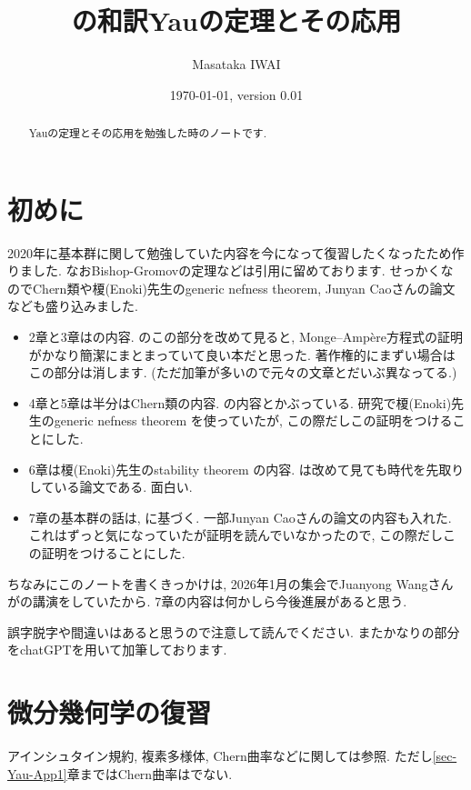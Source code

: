 \documentclass[dvipdfmx,a4paper,11pt]{article} %
\title{の和訳}
\date{\today, version 0.01}
\theoremstyle{definition}
\theoremstyle{remark}
\numberwithin{equation}{section}
\begin{document}
\title{Yauの定理とその応用}
\author{Masataka IWAI}

\maketitle
%
\begin{abstract}
Yauの定理とその応用を勉強した時のノートです. 
\end{abstract}
%
\setcounter{tocdepth}{3}
\tableofcontents

\section*{初めに}

2020年に基本群に関して勉強していた内容を今になって復習したくなったため作りました. 
なおBishop-Gromovの定理などは引用に留めております. 
せっかくなのでChern類や榎(Enoki)先生のgeneric nefness theorem\cite{Eno88}, Junyan Caoさんの論文\cite{Cao13}なども盛り込みました. 

\begin{itemize}
\item 2章と3章は\cite[Section 2, 3]{Sze14}の内容. \cite{Sze14}のこの部分を改めて見ると, Monge--Amp\`ere方程式の証明がかなり簡潔にまとまっていて良い本だと思った. 著作権的にまずい場合はこの部分は消します. (ただ加筆が多いので元々の文章とだいぶ異なってる.)
\item 4章と5章は半分はChern類の内容. \cite[Section 4--6]{Iwa-Chern}の内容とかぶっている. 研究で榎(Enoki)先生のgeneric nefness theorem \cite{Eno88}を使っていたが, この際だしこの証明をつけることにした. 
\item 6章は榎(Enoki)先生のstability theorem \cite{Eno88}の内容. \cite{Eno88}は改めて見ても時代を先取りしている論文である. 面白い. 
\item 7章の基本群の話は, \cite{DPS96, Paun98}に基づく. 一部Junyan Caoさんの論文\cite{Cao13}の内容も入れた. これはずっと気になっていたが証明を読んでいなかったので, この際だしこの証明をつけることにした.
\end{itemize}

ちなみにこのノートを書くきっかけは, 2026年1月の集会でJuanyong Wangさんが\cite{FGSW26}の講演をしていたから. 7章の内容は何かしら今後進展があると思う. 

誤字脱字や間違いはあると思うので注意して読んでください. またかなりの部分をchatGPTを用いて加筆しております. 

\newpage

\section{微分幾何学の復習}
アインシュタイン規約, 複素多様体, Chern曲率などに関しては\cite{Iwa-Chern}参照.
ただし\ref{sec-Yau-App1}章まではChern曲率はでない. 
\end{document}
